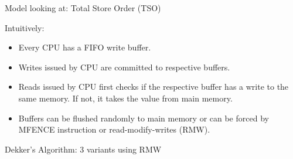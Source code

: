 \documentclass[xcolor=dvipsnames, notes]{beamer}
\begin{document}
    \begin{frame}{Model looking at: Total Store Order (TSO)}

        Intuitively:
        \begin{itemize}
            \item Every CPU has a FIFO write buffer.
            \item Writes issued by CPU are committed to respective buffers. 
            \item Reads issued by CPU first checks if the respective buffer has a write to the same memory. If not, it takes the value from main memory.
            \item Buffers can be flushed randomly to main memory or can be forced by MFENCE instruction or read-modify-writes (RMW).
        \end{itemize}


    \end{frame}


    \begin{frame}{Dekker's Algorithm: 3 variants using RMW}

        \begin{figure}
        \end{figure}

        \begin{figure}
        \end{figure}


    \end{frame}
\end{document}
